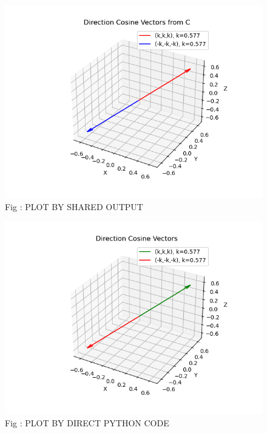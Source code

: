 \documentclass[journal]{IEEEtran}
\begin{document}
\begin{figure}[h!]
  \centering
  \includegraphics[width=0.7\columnwidth]{figs/Figure_1.png} 
   \caption*{Fig : PLOT BY SHARED OUTPUT}
  \label{Fig1}
\end{figure}

\begin{figure}[h!]
  \centering
  \includegraphics[width=0.7\columnwidth]{figs/Figure_2.png} 
   \caption*{Fig : PLOT BY DIRECT PYTHON CODE}
  \label{Fig2}
\end{figure}
\end{document}
